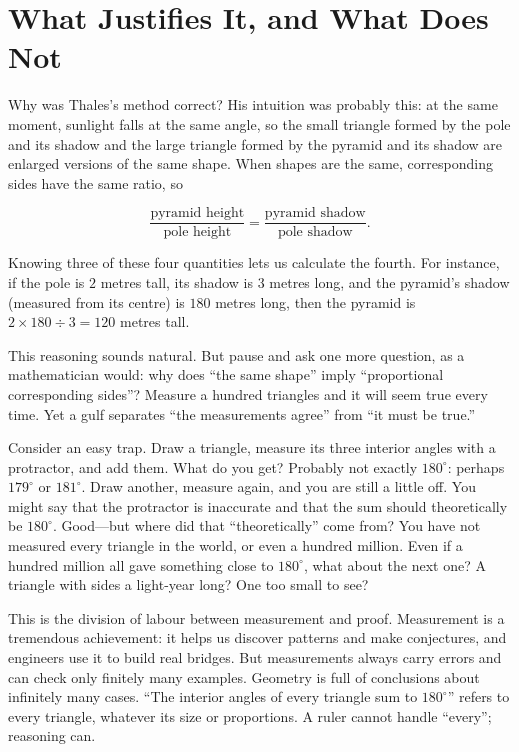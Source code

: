 \section{What Justifies It, and What Does Not}

Why was Thales's method correct? His intuition was probably this: at the same moment, sunlight falls at the same angle, so the small triangle formed by the pole and its shadow and the large triangle formed by the pyramid and its shadow are enlarged versions of the same shape. When shapes are the same, corresponding sides have the same ratio, so

\[
\frac{\text{pyramid height}}{\text{pole height}}=\frac{\text{pyramid shadow}}{\text{pole shadow}}.
\]

Knowing three of these four quantities lets us calculate the fourth. For instance, if the pole is $2$ metres tall, its shadow is $3$ metres long, and the pyramid's shadow (measured from its centre) is $180$ metres long, then the pyramid is $2\times 180\div 3=120$ metres tall.

This reasoning sounds natural. But pause and ask one more question, as a mathematician would: why does ``the same shape'' imply ``proportional corresponding sides''? Measure a hundred triangles and it will seem true every time. Yet a gulf separates ``the measurements agree'' from ``it must be true.''

Consider an easy trap. Draw a triangle, measure its three interior angles with a protractor, and add them. What do you get? Probably not exactly $180^\circ$: perhaps $179^\circ$ or $181^\circ$. Draw another, measure again, and you are still a little off. You might say that the protractor is inaccurate and that the sum should theoretically be $180^\circ$. Good---but where did that ``theoretically'' come from? You have not measured every triangle in the world, or even a hundred million. Even if a hundred million all gave something close to $180^\circ$, what about the next one? A triangle with sides a light-year long? One too small to see?

This is the division of labour between measurement and proof. Measurement is a tremendous achievement: it helps us discover patterns and make conjectures, and engineers use it to build real bridges. But measurements always carry errors and can check only finitely many examples. Geometry is full of conclusions about infinitely many cases. ``The interior angles of every triangle sum to $180^\circ$'' refers to every triangle, whatever its size or proportions. A ruler cannot handle ``every''; reasoning can.

